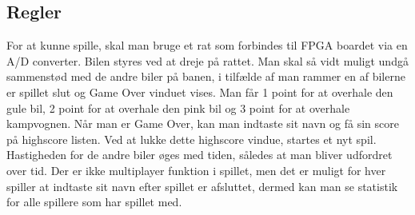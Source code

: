 \subsection{Regler}
For at kunne spille, skal man bruge et rat som forbindes til FPGA boardet via en A/D converter. Bilen styres ved at dreje på rattet.
Man skal så vidt muligt undgå sammenstød med de andre biler på banen, i tilfælde af man rammer en af bilerne er spillet slut og Game Over vinduet vises. Man får 1 point for at overhale den gule bil, 2 point for at overhale den pink bil og 3 point for at overhale kampvognen. Når man er Game Over, kan man indtaste sit navn og få sin score på highscore listen. Ved at lukke dette highscore vindue, startes et nyt spil.
Hastigheden for de andre biler øges med tiden, således at man bliver udfordret over tid. 
Der er ikke multiplayer funktion i spillet, men det er muligt for hver spiller at indtaste sit navn efter spillet er afsluttet, dermed kan man se statistik for alle spillere som har spillet med.